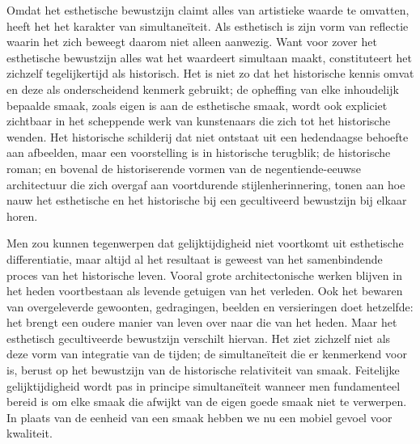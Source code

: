 Omdat het esthetische bewustzijn claimt alles van artistieke waarde te omvatten, heeft het het karakter van simultaneïteit. Als esthetisch is zijn vorm van reflectie waarin het zich beweegt daarom niet alleen aanwezig. Want voor zover het esthetische bewustzijn alles wat het waardeert simultaan maakt, constituteert het zichzelf tegelijkertijd als historisch. Het is niet zo dat het historische kennis omvat en deze als onderscheidend kenmerk gebruikt; de opheffing van elke inhoudelijk bepaalde smaak, zoals eigen is aan de esthetische smaak, wordt ook expliciet zichtbaar in het scheppende werk van kunstenaars die zich tot het historische wenden. Het historische schilderij dat niet ontstaat uit een hedendaagse behoefte aan afbeelden, maar een voorstelling is in historische terugblik; de historische roman; en bovenal de historiserende vormen van de negentiende-eeuwse architectuur die zich overgaf aan voortdurende stijlenherinnering, tonen aan hoe nauw het esthetische en het historische bij een gecultiveerd bewustzijn bij elkaar horen.

Men zou kunnen tegenwerpen dat gelijktijdigheid niet voortkomt uit esthetische differentiatie, maar altijd al het resultaat is geweest van het samenbindende proces van het historische leven. Vooral grote architectonische werken blijven in het heden voortbestaan als levende getuigen van het verleden. Ook het bewaren van overgeleverde gewoonten, gedragingen, beelden en versieringen doet hetzelfde: het brengt een oudere manier van leven over naar die van het heden. Maar het esthetisch gecultiveerde bewustzijn verschilt hiervan. Het ziet zichzelf niet als deze vorm van integratie van de tijden; de simultaneïteit die er kenmerkend voor is, berust op het bewustzijn van de historische relativiteit van smaak. Feitelijke gelijktijdigheid wordt pas in principe simultaneïteit wanneer men fundamenteel bereid is om elke smaak die afwijkt van de eigen goede smaak niet te verwerpen. In plaats van de eenheid van een smaak hebben we nu een mobiel gevoel voor kwaliteit.

